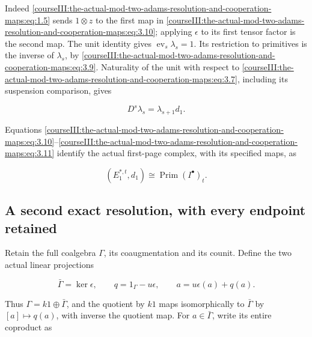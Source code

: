 Indeed \eqref{courseIII:the-actual-mod-two-adams-resolution-and-cooperation-maps:eq:1.5} sends \(1\otimes z\) to the first map in \eqref{courseIII:the-actual-mod-two-adams-resolution-and-cooperation-maps:eq:3.10}; applying \(\epsilon\) to its first tensor factor is the second map. The unit identity gives \(\operatorname{ev}_s\lambda_s=1\). Its restriction to primitives is the inverse of \(\lambda_s\), by \eqref{courseIII:the-actual-mod-two-adams-resolution-and-cooperation-maps:eq:3.9}. Naturality of the unit with respect to \eqref{courseIII:the-actual-mod-two-adams-resolution-and-cooperation-maps:eq:3.7}, including its suspension comparison, gives

\begin{equation}
D^s\lambda_s=\lambda_{s+1}d_1.
 \label{courseIII:the-actual-mod-two-adams-resolution-and-cooperation-maps:eq:3.11}
\end{equation}

Equations \eqref{courseIII:the-actual-mod-two-adams-resolution-and-cooperation-maps:eq:3.10}--\eqref{courseIII:the-actual-mod-two-adams-resolution-and-cooperation-maps:eq:3.11} identify the actual first-page complex, with its specified maps, as

\begin{equation}
(E_1^{*,t},d_1)\cong\operatorname{Prim}(I^\bullet)_t.
 \label{courseIII:the-actual-mod-two-adams-resolution-and-cooperation-maps:eq:3.12}
\end{equation}

\subsection{A second exact resolution, with every endpoint retained}
\label{courseIII:the-actual-mod-two-adams-resolution-and-cooperation-maps:cooperation-full-contraction}

\label{courseIII:the-actual-mod-two-adams-resolution-and-cooperation-maps:section-4}\label{courseIII:actual-resolution:4}

Retain the full coalgebra \(\Gamma\), its coaugmentation and its counit. Define the two actual linear projections

\begin{equation}
\bar\Gamma=\ker\epsilon,\qquad q=1_\Gamma-u\epsilon,
 \qquad a=u\epsilon(a)+q(a).
 \label{courseIII:the-actual-mod-two-adams-resolution-and-cooperation-maps:eq:4.1}
\end{equation}

Thus \(\Gamma=k1\oplus\bar\Gamma\), and the quotient by \(k1\) maps isomorphically to \(\bar\Gamma\) by \([a]\mapsto q(a)\), with inverse the quotient map. For \(a\in\bar\Gamma\), write its entire coproduct as

